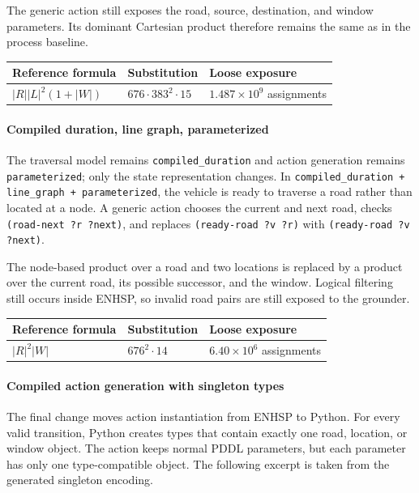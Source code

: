 \documentclass[10pt]{article}
\begin{document}
The generic action still exposes the road, source, destination, and window
parameters. Its dominant Cartesian product therefore remains the same as in
the process baseline.

\begin{center}
\scriptsize
\begin{tabular}{@{}lll@{}}
\toprule
Reference formula & Substitution & Loose exposure \\
\midrule
$|R||L|^2(1+|W|)$ & $676\cdot383^2\cdot15$ & $1.487\times10^9$ assignments \\
\bottomrule
\end{tabular}
\end{center}

\paragraph{Compiled duration, line graph, parameterized}
The traversal model remains \texttt{compiled\_duration} and action generation
remains \texttt{parameterized}; only the state representation changes. In
\texttt{compiled\_duration + line\_graph + parameterized}, the vehicle is ready
to traverse a road rather than located at a node. A generic action chooses the
current and next road, checks \texttt{(road-next ?r ?next)}, and replaces
\texttt{(ready-road ?v ?r)} with \texttt{(ready-road ?v ?next)}.

The node-based product over a road and two locations is replaced by a product
over the current road, its possible successor, and the window. Logical
filtering still occurs inside ENHSP, so invalid road pairs are still exposed to
the grounder.

\begin{center}
\scriptsize
\begin{tabular}{@{}lll@{}}
\toprule
Reference formula & Substitution & Loose exposure \\
\midrule
$|R|^2|W|$ & $676^2\cdot14$ & $6.40\times10^6$ assignments \\
\bottomrule
\end{tabular}
\end{center}

\paragraph{Compiled action generation with singleton types}
The final change moves action instantiation from ENHSP to Python. For every
valid transition, Python creates types that contain exactly one road, location,
or window object. The action keeps normal PDDL parameters, but each parameter
has only one type-compatible object. The following excerpt is taken from the
generated singleton encoding.
\end{document}
